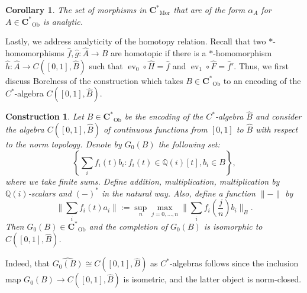 \documentclass[12pt]{amsart}
\newtheorem{corollary}[theorem]{Corollary}
\newtheorem{construction}[theorem]{Construction}
\DeclareMathOperator{\Mor}{Mor}
\DeclareMathOperator{\Ob}{Ob}
\DeclareMathOperator{\ev}{ev}
\newcommand{\Cstar}{\mathbf{C^*}} %
\begin{document}
\begin{corollary} 
    The set of morphisms in $\Cstar_{\Mor}$ that are of the form $\alpha_A$ for $A \in \Cstar_{\Ob}$ is analytic.
\end{corollary}

Lastly, we address analyticity of the homotopy relation.
Recall that two $*$-homomorphisms $\widehat{f}, \widehat{g} \colon \widehat{A} \rightarrow \widehat{B}$ are homotopic if there is a $*$-homomorphism $\widehat{h} \colon \widehat{A} \to C([0,1], \widehat{B})$ such that $\ev_0 \circ \widehat{H} = \widehat{f}$ and $\ev_1 \circ \widehat{F} = \widehat{f}'$. Thus, we first discuss Borelness of the construction which takes $B \in \Cstar_{\Ob}$ to an encoding of the $C^*$-algebra $C([0,1], \widehat{B})$. 

\begin{construction} \label{constr: tensor with C[0,1]}
    Let $B \in \Cstar_{\Ob}$ be the encoding of the $C^*$-algebra $\widehat{B}$ and consider the algebra $C([0,1], \widehat{B})$ of continuous functions from $[0,1]$ to $\widehat{B}$ with respect to the norm topology. 
    Denote by $G_0(B)$ the following set:
    \[ \left\{ \sum_i f_{i}(t) b_{i} \colon f_{i}(t) \in \mathbb{Q}(i)[t], b_{i} \in B \right\}, \]
    where we take finite sums. Define addition, multiplication, multiplication by $\mathbb{Q}(i)$-scalars and $(-)^*$ in the natural way. Also, define a function $\|-\|$ by
    \[ \Big\| \sum_i f_{i}(t) a_{i} \Big\| := \sup_n \max_{j=0, \dots, n} \Big\| \sum_i  f_{i} \left(\frac{j}{n} \right) b_{i} \Big\|_B. \]
    Then $G_0(B) \in \Cstar_{\Ob}$ and the completion of $G_0(B)$ is isomorphic to $C([0,1], \widehat{B})$.
\end{construction}

Indeed, that $\widehat{G_0(B)} \cong C([0,1], \widehat{B})$ as $C^*$-algebras follows since the inclusion map $G_0(B) \rightarrow C([0,1], \widehat{B})$ is isometric, and the latter object is norm-closed. 
\end{document}
